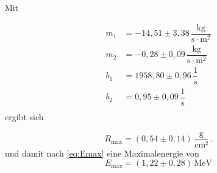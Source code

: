 Mit

\begin{align*}
    m_1 &= -14,51  \pm 3,38\,  \dfrac{\unit{\kilo\gram}}{\unit{\second \cdot \meter^2}}\\
    m_2 &= -0,28   \pm 0,09\,  \dfrac{\unit{\kilo\gram}}{\unit{\second \cdot \meter^2}}  \\
    b_1 &= 1958,80 \pm 0,96\,  \dfrac{1}{\unit{\second}}                         \\
    b_2 &= 0,95    \pm 0,09\,  \dfrac{1}{\unit{\second}}                          \\
\end{align*} ergibt sich

\begin{equation*}
    R_\text{max} = \left( 0,54 \pm 0,14 \right) \, \dfrac{\unit{\gram}}{\unit{\cm²}} \,.
\end{equation*}
und damit nach \eqref{eq:Emax} eine Maximalenergie von
\begin{equation*}
    E_\text{max} = \left(1,22 \pm 0,28 \right) \, \unit{\mega\eV}
\end{equation*}


